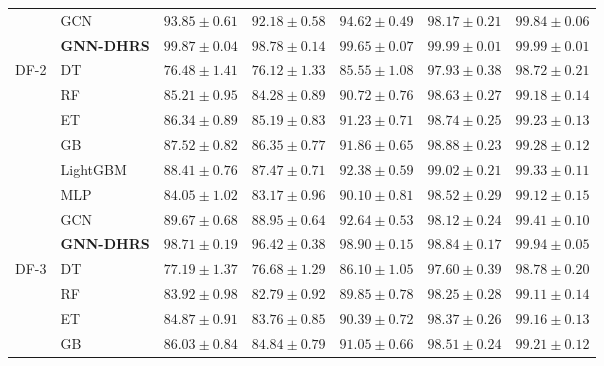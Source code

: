 \documentclass[pdflatex,sn-mathphys-num]{sn-jnl}%
\theoremstyle{thmstyleone}%
\theoremstyle{thmstyletwo}%
\theoremstyle{thmstylethree}%
\begin{document}
\begin{table}[!ht]
\begin{tabular}{@{}llccccc@{}}
& GCN
& $93.85\pm0.61$
& $92.18\pm0.58$
& $94.62\pm0.49$
& $98.17\pm0.21$
& $99.84\pm0.06$ \\

& \textbf{GNN-DHRS}
& \textbf{$99.87\pm0.04$}
& \textbf{$98.78\pm0.14$}
& \textbf{$99.65\pm0.07$}
& \textbf{$99.99\pm0.01$}
& \textbf{$99.99\pm0.01$} \\

\midrule

\multirow{8}{*}{DF-2}
& DT
& $76.48\pm1.41$
& $76.12\pm1.33$
& $85.55\pm1.08$
& $97.93\pm0.38$
& $98.72\pm0.21$ \\

& RF
& $85.21\pm0.95$
& $84.28\pm0.89$
& $90.72\pm0.76$
& $98.63\pm0.27$
& $99.18\pm0.14$ \\

& ET
& $86.34\pm0.89$
& $85.19\pm0.83$
& $91.23\pm0.71$
& $98.74\pm0.25$
& $99.23\pm0.13$ \\

& GB
& $87.52\pm0.82$
& $86.35\pm0.77$
& $91.86\pm0.65$
& $98.88\pm0.23$
& $99.28\pm0.12$ \\

& LightGBM
& $88.41\pm0.76$
& $87.47\pm0.71$
& $92.38\pm0.59$
& $99.02\pm0.21$
& $99.33\pm0.11$ \\

& MLP
& $84.05\pm1.02$
& $83.17\pm0.96$
& $90.10\pm0.81$
& $98.52\pm0.29$
& $99.12\pm0.15$ \\

& GCN
& $89.67\pm0.68$
& $88.95\pm0.64$
& $92.64\pm0.53$
& $98.12\pm0.24$
& $99.41\pm0.10$ \\

& \textbf{GNN-DHRS}
& \textbf{$98.71\pm0.19$}
& \textbf{$96.42\pm0.38$}
& \textbf{$98.90\pm0.15$}
& \textbf{$98.84\pm0.17$}
& \textbf{$99.94\pm0.05$} \\

\midrule

\multirow{8}{*}{DF-3}
& DT
& $77.19\pm1.37$
& $76.68\pm1.29$
& $86.10\pm1.05$
& $97.60\pm0.39$
& $98.78\pm0.20$ \\

& RF
& $83.92\pm0.98$
& $82.79\pm0.92$
& $89.85\pm0.78$
& $98.25\pm0.28$
& $99.11\pm0.14$ \\

& ET
& $84.87\pm0.91$
& $83.76\pm0.85$
& $90.39\pm0.72$
& $98.37\pm0.26$
& $99.16\pm0.13$ \\

& GB
& $86.03\pm0.84$
& $84.84\pm0.79$
& $91.05\pm0.66$
& $98.51\pm0.24$
& $99.21\pm0.12$ \\


\end{tabular}
\end{table}
\end{document}
